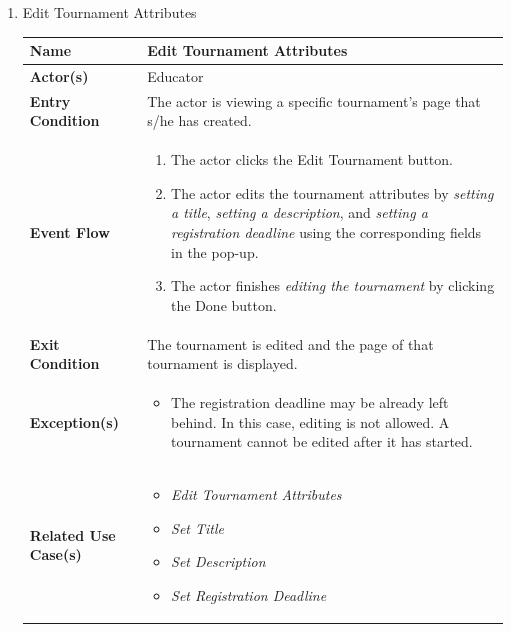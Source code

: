 \begin{enumerate}
\item Edit Tournament Attributes
\begin{center}
    \begin{tabular}{ | m{10em} | m{10cm}| } 
      \hline
      \textbf{Name} & Edit Tournament Attributes \\ 
      \hline
      \textbf{Actor(s)} & Educator \\ 
      \hline
      \textbf{Entry Condition} & The actor is viewing a specific tournament's page that s/he has created. \\ 
      \hline
      \textbf{Event Flow} & 
          \begin{enumerate}[(1)]
              \item The actor clicks the Edit Tournament button.
              \item The actor edits the tournament attributes by \textit{setting a title}, \textit{setting a description}, and \textit{setting a registration deadline} using the corresponding fields in the pop-up.
              \item The actor finishes \textit{editing the tournament} by clicking the Done button.
          \end{enumerate}
      \\ 
      \hline
      \textbf{Exit Condition} & The tournament is edited and the page of that tournament is displayed.  \\ 
      \hline
      \textbf{Exception(s)} & 
      \begin{itemize}
          \item The registration deadline may be already left behind. In this case, editing is not allowed. A tournament cannot be edited after it has started.
      \end{itemize}
          \\ 
      \hline
      \textbf{Related Use Case(s)} & 
      \begin{itemize}
          \item \textit{Edit Tournament Attributes}
          \item \textit{Set Title}
          \item \textit{Set Description}
          \item \textit{Set Registration Deadline}
      \end{itemize}
          \\ 
      \hline
    \end{tabular}
     \label{tbl:uc21}
\end{center}


\end{enumerate}
